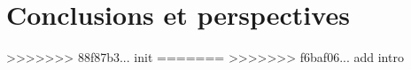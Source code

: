 \documentclass[a4paper, 12pt]{report}
\begin{document}
    
\part{Conclusions et perspectives}
    

>>>>>>> 88f87b3... init
=======
>>>>>>> f6baf06... add intro


\newpage

\nocite{*}



\end{document}

